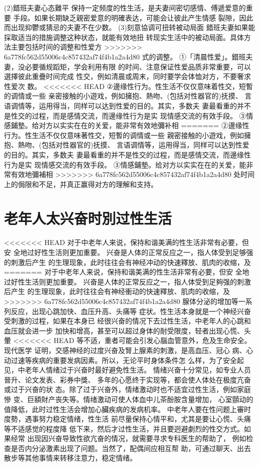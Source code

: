 \documentclass[12pt,UTF8]{ctexbook}
\begin{document}
(2)錯班夫妻心态難平
保持一定频度的性生活，是夫妻间密切感情、傅遞爱意的重要
手段。如果长期缺乏親密爱意的明確表达，可能会让彼此产生情感
裂隙，因此而出现抑鬱或猜忌的夫妻不在少数。
(3)刻意協调可扭转被动局面
錯班夫妻如果能採取适当的措施调整这种状态，就能有效地扭
转现实生活中的被动局面。具体方法主要包括时间的调整和性爱方
>>>>>>> 6a778fc562d55006c4c857432af74f4b1a2a4d80
式的调整。
①「清晨性爱」。錯班夫妻，没必要循规蹈矩，学会利用有限
的时间、注意保证性爱品质非常重要，可以選擇彼此重疊时间完成
性交，例如清晨或周末，同时要学会体恤对方，不要奢求性爱次
数。
<<<<<<< HEAD
②邊缘性行为。性生活不仅仅意味着性交，短暫的调情或一些
亲密接触的小遊戏，例如擁抱、熱吻、(包括对性器官的)抚摸、
言语调情等，运用得当，同样可以达到性爱的目的。其实，多数夫
妻最看重的并不是性交的过程，而是感情交流，而邊缘性行为是实
现情感交流的有效手段。
③情感鋪墊。给对方以实实在在的关爱，能非常有效地彌补相
=======
②邊缘性行为。性生活不仅仅意味著性交，短暫的调情或一些
親密接触的小遊戏，例如擁抱、熱吻、(包括对性器官的)抚摸、
言语调情等，运用得当，同样可以达到性爱的目的。其实，多数夫
妻最看重的并不是性交的过程，而是感情交流，而邊缘性行为是实
现情感交流的有效手段。
③情感鋪墊。给对方以实实在在的关爱，能非常有效地彌補相
>>>>>>> 6a778fc562d55006c4c857432af74f4b1a2a4d80
处时间上的侷限和不足，并真正赢得对方的理解和支持。


\section{老年人太兴奋时別过性生活}

<<<<<<< HEAD
对于中老年人来说，保持和谐美满的性生活非常有必要，但安
全地过好性生活则更加重要。
兴奋是人体的正常反应之一，指人体受到足够强的刺激后产生
的生理现象，此时往往会有神经冲动的快速釋放、肌肉的收缩，及
=======
对于中老年人来说，保持和谐美满的性生活非常有必要，但安
全地过好性生活则更加重要。
兴奋是人体的正常反应之一，指人体受到足夠强的刺激后产生
的生理现象，此时往往会有神经衝动的快速釋放、肌肉的收缩，及
>>>>>>> 6a778fc562d55006c4c857432af74f4b1a2a4d80
腺体分泌的增加等一系列反应，出现心跳加快、血压升高、头痛等
症状。性生活本身就是一个神经兴奋受刺激的过程，如果在本身已
经很兴奋的情况下去过性生活，中老年人的心跳和血压就会进一步
加快和增高，甚至可以超过身体的耐受限度，轻者出现心慌、头暈
<<<<<<< HEAD
等不适，重者可能会引发心腦血管意外，危及生命安全。现代医学
证明，交感神经的过度兴奋及腎上腺素的刺激，是高血压、冠心
病、心动过速等疾病的重要发病因素。所以，无论平时身体条件怎
么样，为了安全起见，中老年人情绪过于兴奋时最好避免性生活。
情绪兴奋十分常见，如专业人员晉升、论文发表、彩券中獎、
多年的心愿终于实现等，都会使人体处在极度亢奋或过于兴奋的状
态。除了过于兴奋外，情绪激动时也不适宜过性生活，例如家庭慘
变、巨額財产丧失等。情绪激动可使人体血中儿茶酚胺含量增加，
心室顫动的值降低，此时过性生活会增加心臟疾病的发病机率。
中老年人要在性问题上審时度勢，遇事努力稳定情绪，性生活
前尽量保持心情平和，尤其是要让心慌、头痛等不适感觉的程度降
低下来，然后才过性生活，并且要迥避劇烈的性交方式。如果经常
出现因兴奋导致性欲亢奋的情况，就需要寻求专科医生的帮助了，
例如检查是否内分泌激素出现了问题。当然了，配偶间应相互帮
助，可通过聊天、出去散步等其他事情来转移注意力，稳定情绪。
\end{document}
